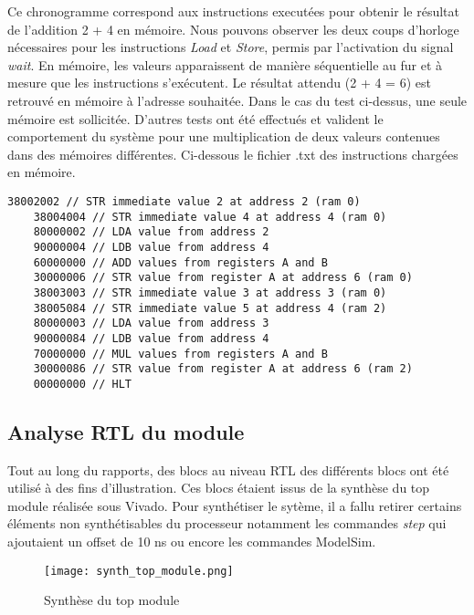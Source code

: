 \indent Ce chronogramme correspond aux instructions executées pour obtenir le résultat de l'addition 2 + 4 en mémoire.
Nous pouvons observer les deux coups d'horloge nécessaires pour les instructions \textit{Load} et \textit{Store}, permis par l'activation du signal \textit{wait}.
En mémoire, les valeurs apparaissent de manière séquentielle au fur et à mesure que les instructions s'exécutent.
Le résultat attendu (2 + 4 = 6) est retrouvé en mémoire à l'adresse souhaitée.
Dans le cas du test ci-dessus, une seule mémoire est sollicitée. 
D'autres tests ont été effectués et valident le comportement du système pour une multiplication de deux valeurs contenues dans des mémoires différentes.
Ci-dessous le fichier .txt des instructions chargées en mémoire.

\newpage

\begin{lstlisting}[frame=single, basicstyle = \ttfamily \footnotesize]
	38002002 // STR immediate value 2 at address 2 (ram 0)	
	38004004 // STR immediate value 4 at address 4 (ram 0)
	80000002 // LDA value from address 2
	90000004 // LDB value from address 4
	60000000 // ADD values from registers A and B
	30000006 // STR value from register A at address 6 (ram 0)
	38003003 // STR immediate value 3 at address 3 (ram 0)
	38005084 // STR immediate value 5 at address 4 (ram 2)
	80000003 // LDA value from address 3
	90000084 // LDB value from address 4
	70000000 // MUL values from registers A and B
	30000086 // STR value from register A at address 6 (ram 2)
	00000000 // HLT
\end{lstlisting}

\subsection{Analyse RTL du module}

\indent Tout au long du rapports, des blocs au niveau \gls{RTL} des différents blocs ont été utilisé à des fins d'illustration.
Ces blocs étaient issus de la synthèse du top module réalisée sous Vivado.
Pour synthétiser le sytème, il a fallu retirer certains éléments non synthétisables du processeur notamment les commandes \textit{step} qui ajoutaient un offset de 10 ns ou encore les commandes ModelSim.

\begin{figure}[h]
	\centering
	\texttt{[image: synth\_top\_module.png]}
	\caption{Synthèse du top module}
	\label{fig:synth_top_module}
\end{figure}



